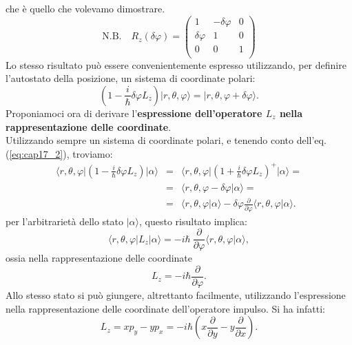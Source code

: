 che è quello che volevamo dimostrare.
\begin{equation}
\textrm{N.B.} \quad 
R_z (\delta \varphi)=
\begin{pmatrix}
1 & -\delta \varphi & 0\\
\delta \varphi & 1 & 0 \\
0 & 0 & 1 \\
\end{pmatrix}
\end{equation}
Lo stesso risultato può essere convenientemente espresso utilizzando, per definire l'autostato della posizione, un sistema di coordinate polari:
\begin{equation}
\left(1- \frac{i}{\hbar}\delta \varphi L_z\right)\vert r, \theta, \varphi\rangle = \vert r, \theta, \varphi + \delta\varphi\rangle .
\label{eq:cap17_2}
\end{equation}
Proponiamoci ora di derivare l'\textbf{espressione dell'operatore $L_z$ nella rappresentazione delle coordinate}.\\
Utilizzando sempre un sistema di coordinate polari, e tenendo conto dell'eq. (\ref{eq:cap17_2}), troviamo:
\begin{eqnarray}
\langle r, \theta, \varphi \vert \left(1- \frac{i}{\hbar}\delta \varphi L_z\right) \vert \alpha\rangle &=& \langle r, \theta, \varphi \vert \left(1+ \frac{i}{\hbar}\delta \varphi L_z\right) ^+ \vert \alpha\rangle =\nonumber \\
&=& \langle r, \theta, \varphi - \delta \varphi \vert\alpha\rangle  = \nonumber \\
&=& \langle r, \theta, \varphi \vert \alpha\rangle - \delta \varphi \frac{\partial}{\partial \varphi}\langle r, \theta, \varphi \vert\alpha\rangle .
\end{eqnarray}
per l'arbitrarietà dello stato $\vert \alpha \rangle$, questo risultato implica:
\begin{equation}
\langle r, \theta, \varphi \vert  L_z \vert \alpha\rangle =- i\hbar\ \frac{\partial}{\partial \varphi}\langle r, \theta, \varphi \vert\alpha\rangle ,
\end{equation}
ossia nella rappresentazione delle coordinate
\begin{equation}
L_z = -i\hbar \frac{\partial}{\partial \varphi}.
\label{eq:cap17_4}
\end{equation}
Allo stesso stato si può giungere, altrettanto facilmente, utilizzando l'espressione nella rappresentazione delle coordinate  dell'operatore impulso. Si ha infatti:
\begin{equation}
L_z= xp_y-yp_x = -i\hbar \left( x\frac{\partial}{\partial y} -y\frac{\partial}{\partial x}\right) .
\label{eq:cap17_3}
\end{equation}
